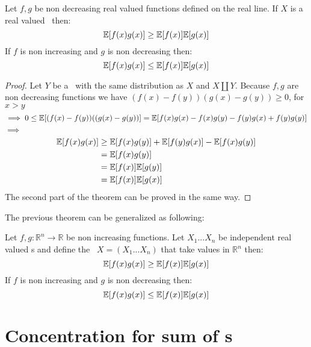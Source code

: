\begin{teo}
	Let $f,g$ be non decreasing real valued functions defined on the real line. If $X$ is a real valued \rv \  then:$$\mathbb{E}[f(x)g(x)]\geq \mathbb{E}[f(x)]\mathbb{E}[g(x)]$$
	If $f$ is non increasing and $g$ is non decreasing then:
	$$\mathbb{E}[f(x)g(x)]\leq \mathbb{E}[f(x)]\mathbb{E}[g(x)]$$ 
\end{teo}
\begin{proof}
	Let $Y$ be a \rv \  with the same distribution as $X$ and $X\coprod Y$. Because $f,g$ are non decreasing functions we have $(f(x)-f(y))(g(x)-g(y))\geq 0$, for $x>y$
	\[
		\implies  0 \leq \mathbb{E}[(f(x)-f(y))((g(x)-g(y))]=\mathbb{E}[f(x)g(x)-f(x)g(y)-f(y)g(x) + f(y)g(y)]
	\]
	$\implies$
	\[
	\begin{split}
\mathbb{E}[f(x)g(x)] &\geq \mathbb{E}[f(x)g(y)]+ \mathbb{E}[f(y)g(x)]- \mathbb{E}[f(x)g(y)] \\&=\mathbb{E}[f(x)g(y)]\\&=\mathbb{E}[f(x)]\mathbb{E}[g(y)]\\&=\mathbb{E}[f(x)]\mathbb{E}[g(x)]
	\end{split}
	\]
	The second part of the theorem can be proved in the same way.
\end{proof}
The previous theorem can be generalized as following:
\begin{teo}
	Let $f,g: \mathbb{R}^n\to \mathbb{R}$ be non increasing functions. Let $X_1...X_n$ be independent real valued \rv s and define the \rv \ $X=(X_1...X_n)$ that take values in $\mathbb{R}^n$ then:
	$$\mathbb{E}[f(x)g(x)]\geq \mathbb{E}[f(x)]\mathbb{E}[g(x)]$$
	If $f$ is non increasing and $g$ is non decreasing then:
	$$\mathbb{E}[f(x)g(x)]\leq \mathbb{E}[f(x)]\mathbb{E}[g(x)]$$
\end{teo}

\section{Concentration for sum of \rv s}

